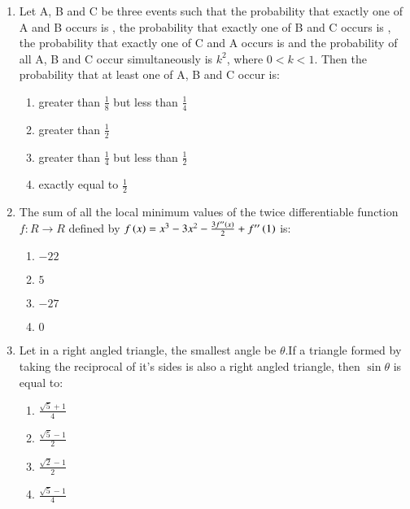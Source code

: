 \documentclass[journal]{IEEEtran}
\begin{document}
\begin{enumerate}
    \item Let A, B and C be three events such that the probability that exactly one of A and B occurs is , the probability that exactly one of B and C occurs is , the probability that exactly one of C and A occurs is  and the probability of all A, B and C occur simultaneously is $k^2$, where $0<k<1$. Then the probability that at least one of A, B and C occur is:

        \begin{multicols}{2}
            \begin{enumerate}
                \item greater than $\frac{1}{8}$ but less than $\frac{1}{4}$
                \item greater than $\frac{1}{2}$
                \item greater than $\frac{1}{4}$ but less than $\frac{1}{2}$
                \item exactly equal to $\frac{1}{2}$
            \end{enumerate}
        \end{multicols}

    \item The sum of all the local minimum values of the twice differentiable function $f:R\rightarrow R$ defined by $f\left(x\right)=x^3-3x^2-\frac{3f''\left(x\right)}{2}+f''\left(1\right)$ is:

        \begin{multicols}{4}
            \begin{enumerate}
                \item $-22$
                \item $5$
                \item $-27$
                \item $0$
            \end{enumerate}
        \end{multicols}

    \item Let in a right angled triangle, the smallest angle be $\theta$.If a triangle formed by taking the reciprocal of it's sides is also a right angled triangle, then $\sin \theta$ is equal to:

        \begin{multicols}{4}
            \begin{enumerate}
                \item $\frac{\sqrt{5}+1}{4}$
                \item $\frac{\sqrt{5}-1}{2}$
                \item $\frac{\sqrt{2}-1}{2}$
                \item $\frac{\sqrt{5}-1}{4}$
            \end{enumerate}
        \end{multicols}


\end{enumerate}
\end{document}
